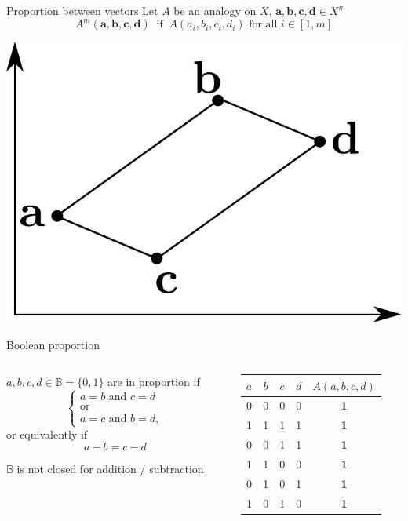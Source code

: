 \documentclass{beamer}
\begin{document}
\begin{frame}{Proportion between vectors}
  Let $A$ be an analogy on $X$, $\mathbf{a}, \mathbf{b}, \mathbf{c}, \mathbf{d}
  \in X^m$
  $$A^m(\mathbf{a}, \mathbf{b}, \mathbf{c}, \mathbf{d}) ~ \text{  if  } ~
  A(a_i, b_i, c_i, d_i) \text{ for all } i \in [1, m]$$

  \begin{center}
    \includegraphics[width=.3\textwidth]{figures/arithmetic_proportion.pdf}
  \end{center}
\end{frame}

\begin{frame}{Boolean proportion}
  \begin{columns}
    \begin{column}{0.4\textwidth}
  $a, b, c, d \in \mathbb{B} = \{0, 1\}$ are in proportion if
  $$
  \begin{cases}
    a = b \text{ and } c = d\\
    \text{or}\\
    a = c \text{ and } b = d,
  \end{cases}
  $$
      \alert{
  or equivalently if
}
  $$a - b = c - d$$

      {\selectfont{}\relax} $\mathbb{B}$
      is not closed for addition / subtraction
    \end{column}
    \begin{column}{0.4\textwidth}
  \begin{table}[t]
    \centering
    \begin{tabular}[t]{ccccc}
      \toprule
      $a$ & $b$ & $c$ & $d$ &  $A(a, b, c, d)$\\
      \midrule
      0 & 0 & 0 & 0 &   \textbf{1}\\
      1 & 1 & 1 & 1 &   \textbf{1}\\
      0 & 0 & 1 & 1 &   \textbf{1}\\
      1 & 1 & 0 & 0 &   \textbf{1}\\
      0 & 1 & 0 & 1 &   \textbf{1}\\
      1 & 0 & 1 & 0 &   \textbf{1}\\
      \bottomrule
    \end{tabular}
  \end{table}
    \end{column}
  \end{columns}
\end{frame}
\end{document}
